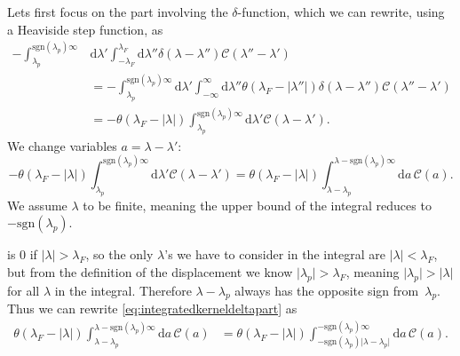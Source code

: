 \documentclass[11pt, a4paper,draft]{report} %
\newcommand{\kernel}{\mathcal{C}}
\begin{document}
Lets first focus on the part involving the \(\delta\)-function, which we can rewrite, using a Heaviside step function, as
\begin{align}
	- \int_{\lambda_p}^{\textrm{sgn}(\lambda_p)\infty} &\mathrm{d}\lambda' \int_{-\lambda_F}^{\lambda_F} \textrm{d} \lambda'' \delta(\lambda-\lambda'') \kernel(\lambda''-\lambda') \\
	&=- \int_{\lambda_p}^{\textrm{sgn}(\lambda_p)\infty} \mathrm{d}\lambda' \int_{-\infty}^{\infty} \textrm{d} \lambda'' \theta(\lambda_F - \lvert \lambda'' \rvert)  \delta(\lambda-\lambda'') \kernel(\lambda''-\lambda')\\
	&= - \theta(\lambda_F - \lvert \lambda \rvert) \int_{\lambda_p}^{\textrm{sgn}(\lambda_p)\infty} \mathrm{d}\lambda'     \kernel(\lambda-\lambda').
\end{align}
We change variables \(a=\lambda-\lambda'\):
\begin{equation}\label{eq:integratedkerneldeltapart}
	- \theta(\lambda_F - \lvert \lambda \rvert) \int_{\lambda_p}^{\textrm{sgn}(\lambda_p)\infty} \mathrm{d}\lambda'     \kernel(\lambda-\lambda')=
	 \theta(\lambda_F - \lvert \lambda \rvert) \int_{\lambda-\lambda_p}^{\lambda - \textrm{sgn}(\lambda_p)\infty} \mathrm{d}a\,\kernel(a).
\end{equation}
We assume \(\lambda\) to be finite, meaning the upper bound of the integral reduces to \(-\textrm{sgn}(\lambda_p)\).

 is 0 if \(\lvert \lambda\rvert > \lambda_F\), so the only \(\lambda\)'s we have to consider in the integral are \(\lvert\lambda\rvert< \lambda_F\), but from the definition of the displacement we know \(\lvert\lambda_p\rvert >\lambda_F\), meaning \(\lvert\lambda_p\rvert > \lvert\lambda\rvert\) for all \(\lambda\) in the integral.
Therefore \(\lambda-\lambda_p\) always has the opposite sign from~\(\lambda_p\).
Thus we can rewrite \cref{eq:integratedkerneldeltapart} as
\begin{align}
	\theta(\lambda_F - \lvert \lambda \rvert) \int_{\lambda-\lambda_p}^{\lambda - \textrm{sgn}(\lambda_p)\infty} \mathrm{d}a\,\kernel(a) &=
	\theta(\lambda_F - \lvert \lambda \rvert) \int_{-\textrm{sgn}(\lambda_p)\lvert\lambda-\lambda_p\rvert}^{ - \textrm{sgn}(\lambda_p)\infty} \mathrm{d}a\,\kernel(a).
\end{align}
\end{document}
